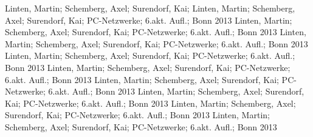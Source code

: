  Linten, Martin; Schemberg, Axel; Surendorf, Kai;
 Linten, Martin; Schemberg, Axel; Surendorf, Kai; PC-Netzwerke; 6.akt. Aufl.; Bonn 2013
 Linten, Martin; Schemberg, Axel; Surendorf, Kai; PC-Netzwerke; 6.akt. Aufl.; Bonn 2013
 Linten, Martin; Schemberg, Axel; Surendorf, Kai; PC-Netzwerke; 6.akt. Aufl.; Bonn 2013
 Linten, Martin; Schemberg, Axel; Surendorf, Kai; PC-Netzwerke; 6.akt. Aufl.; Bonn 2013
 Linten, Martin; Schemberg, Axel; Surendorf, Kai; PC-Netzwerke; 6.akt. Aufl.; Bonn 2013
 Linten, Martin; Schemberg, Axel; Surendorf, Kai; PC-Netzwerke; 6.akt. Aufl.; Bonn 2013
 Linten, Martin; Schemberg, Axel; Surendorf, Kai; PC-Netzwerke; 6.akt. Aufl.; Bonn 2013
 Linten, Martin; Schemberg, Axel; Surendorf, Kai; PC-Netzwerke; 6.akt. Aufl.; Bonn 2013
 Linten, Martin; Schemberg, Axel; Surendorf, Kai; PC-Netzwerke; 6.akt. Aufl.; Bonn 2013